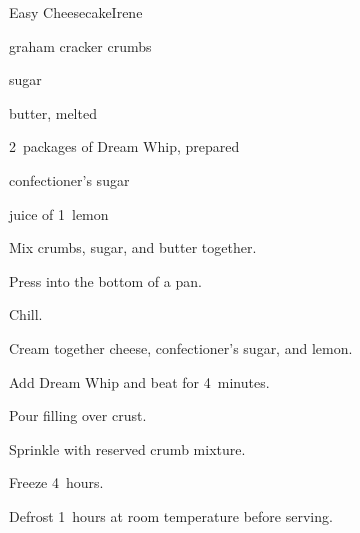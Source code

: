 \begin{recipe}{Easy Cheesecake}{Irene}{}

\begin{ingredients}
\item \C{1\third} graham cracker crumbs
\item \C{\quarter} sugar
\item \C{\quarter} butter, melted
\item 2~packages of Dream Whip, prepared
\item {} 
\item {} confectioner's sugar
\item juice of 1~lemon
\end{ingredients}

\begin{directions}
\item Mix crumbs, sugar, and butter together.
\item Press \twothird{} into the bottom of a pan.
\item Chill.
\item Cream together cheese, confectioner's sugar, and lemon.
\item Add Dream Whip and beat for 4~minutes.
\item Pour filling over crust.
\item Sprinkle with reserved crumb mixture.
\item Freeze 4~hours.
\item Defrost 1\half~hours at room temperature before serving.
\end{directions}

\end{recipe}
